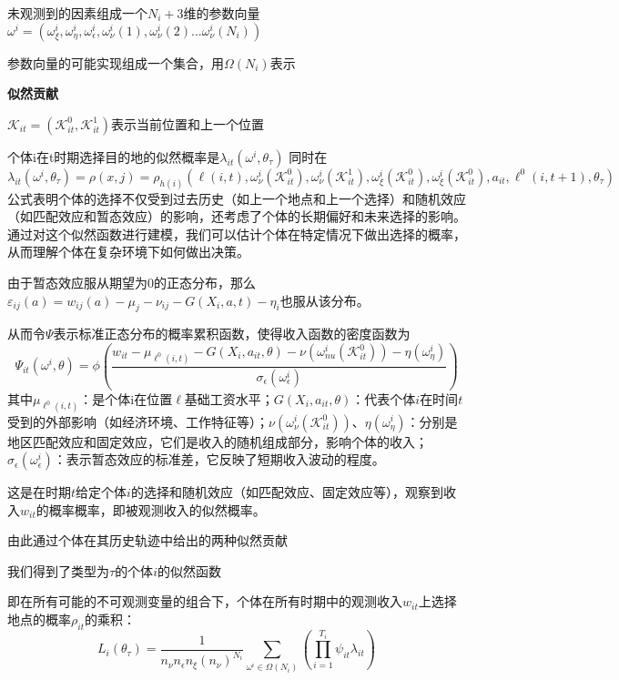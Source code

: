 \documentclass[a4paper,12pt,oneside]{book} %
\begin{document}
未观测到的因素组成一个$N_{i}+3$维的参数向量$\omega^{i}=(\omega^{i}_{\xi},\omega^{i}_{\eta},\omega^{i}_{\epsilon},\omega^{i}_{\nu}(1),\omega^{i}_{\nu}(2)...\omega^{i}_{\nu}(N_{i}))$

参数向量的可能实现组成一个集合，用$\Omega(N_{i})$表示

\textbf{似然贡献}

$\mathcal{K}_{it}=(\mathcal{K}_{it}^{0},\mathcal{K}_{it}^{1})$表示当前位置和上一个位置

个体i在t时期选择目的地的似然概率是$\lambda_{it}(\omega^{i},\theta_{\tau})$
同时在
\begin{equation}
  \lambda_{it}(\omega^{i},\theta_{\tau})=\rho(x,j)=\rho_{h(i)}(\ell(i,t),\omega_{\nu}^{i}(\mathcal{K}_{it}^{0}),\omega_{\nu}^{i}(\mathcal{K}_{it}^{1}),\omega_{\xi}^{i}(\mathcal{K}_{it}^{0}),\omega_{\xi}^{i}(\mathcal{K}_{it}^{0}),a_{it},\ell^{0}(i,t+1),\theta_{\tau})
\end{equation}
公式表明个体的选择不仅受到过去历史（如上一个地点和上一个选择）和随机效应（如匹配效应和暂态效应）的影响，还考虑了个体的长期偏好和未来选择的影响。
通过对这个似然函数进行建模，我们可以估计个体在特定情况下做出选择的概率，从而理解个体在复杂环境下如何做出决策。


由于暂态效应服从期望为0的正态分布，那么$\varepsilon_{ij}(a)=w_{ij}(a)-\mu_j-\nu_{ij}-G(X_i,a,t)-\eta_i$也服从该分布。

从而令$\Psi$表示标准正态分布的概率累积函数，使得收入函数的密度函数为
\begin{equation}
  \Psi_{it}(\omega^{i},\theta)=\phi(\frac{w_{it} - \mu_{\ell^{0}(i,t)}-G(X_{i},a_{it},\theta)-\nu(\omega_{nu}^{i}(\mathcal{K}_{it}^{0}))-\eta(\omega_{\eta}^{i})  }{\sigma_{\epsilon}(\omega_{\epsilon}^{i})})
\end{equation}
其中$\mu_{\ell^{0}(i,t)}$：是个体i在位置$\ell$基础工资水平；$G(X_i, a_{it}, \theta)$：代表个体$i$在时间$t$受到的外部影响（如经济环境、工作特征等）；$\nu(\omega_{\nu}^i(\mathcal{K}_{it}^0))$、$\eta(\omega_{\eta}^i)$：分别是地区匹配效应和固定效应，它们是收入的随机组成部分，影响个体的收入；$\sigma_{\epsilon}(\omega_{\epsilon}^i)$：表示暂态效应的标准差，它反映了短期收入波动的程度。

这是在时期$t$给定个体$i$的选择和随机效应（如匹配效应、固定效应等），观察到收入$w_{it}$的概率概率，即被观测收入的似然概率。

由此通过个体在其历史轨迹中给出的两种似然贡献

我们得到了类型为$\tau$的个体$i$的似然函数

即在所有可能的不可观测变量的组合下，个体在所有时期中的观测收入$w_{it}$上选择地点的概率$\rho_{it}$的乘积：
\begin{equation}
  L_{i}(\theta_{\tau})=\frac{1}{n_{\nu}n_{\epsilon}n_{\xi}(n_{\nu})^{N_{i}}} \sum\limits_{\omega^{i}\in\Omega(N_{i})}(\prod\limits_{i=1}^{T_{i}} \psi_{it}\lambda_{it})
\end{equation}
\end{document}
